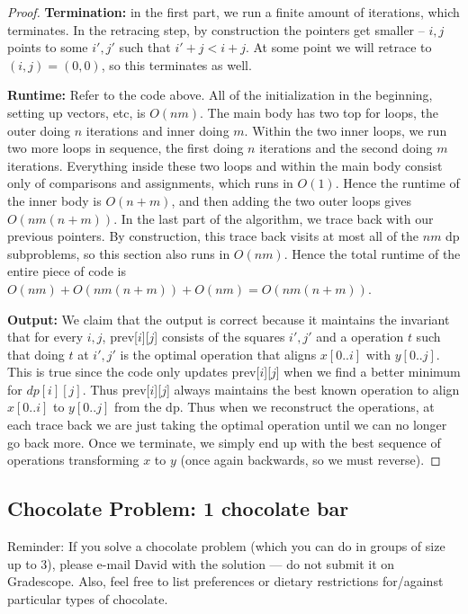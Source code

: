 \documentclass[10pt]{article}
\begin{document}
\begin{proof}
  \textbf{Termination:} in the first part, we run a finite amount of iterations, which terminates. In the retracing step, by construction the pointers get smaller -- \(i, j\) points to some \(i', j'\) such that \(i' + j < i + j\). At some point we will retrace to \((i, j) = (0, 0)\), so this terminates as well.

  \textbf{Runtime:} Refer to the code above. All of the initialization in the beginning, setting up vectors, etc, is \(O(nm)\). The main body has two top for loops, the outer doing \(n\) iterations and inner doing \(m\). Within the two inner loops, we run two more loops in sequence, the first doing \(n\) iterations and the second doing \(m\) iterations. Everything inside these two loops and within the main body consist only of comparisons and assignments, which runs in \(O(1)\). Hence the runtime of the inner body is \(O(n + m)\), and then adding the two outer loops gives \(O(nm(n + m))\). In the last part of the algorithm, we trace back with our previous pointers. By construction, this trace back visits at most all of the \(nm\) dp subproblems, so this section also runs in \(O(nm)\). Hence the total runtime of the entire piece of code is \(O(nm) + O(nm(n + m)) + O(nm) = O(nm(n + m))\).

  \textbf{Output:} We claim that the output is correct because it maintains the invariant that for every \(i, j\), prev[\(i\)][\(j\)] consists of the squares \(i', j'\) and a operation \(t\) such that doing \(t\) at \(i', j'\) is the optimal operation that aligns \(x[0..i]\) with \(y[0..j]\). This is true since the code only updates prev[\(i\)][\(j\)] when we find a better minimum for \(dp[i][j]\). Thus prev[\(i\)][\(j\)] always maintains the best known operation to align \(x[0..i]\) to \(y[0..j]\) from the dp. Thus when we reconstruct the operations, at each trace back we are just taking the optimal operation until we can no longer go back more. Once we terminate, we simply end up with the best sequence of operations transforming \(x\) to \(y\) (once again backwards, so we must reverse).
\end{proof}

\subsection*{Chocolate Problem: 1 chocolate bar}
  
Reminder: If you solve a chocolate problem (which you can do in groups of size up to 3), please e-mail David with the solution --- do not submit it on Gradescope. Also, feel free to list preferences or dietary restrictions for/against particular types of chocolate.
\end{document}

